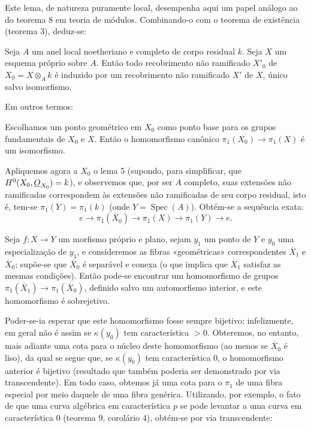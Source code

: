 Este lema, de natureza puramente local, desempenha aqui um papel análogo ao do
teorema 8 em teoria de módulos. Combinando-o com o teorema de existência
(teorema 3), deduz-se:

 Seja $A$ um anel local noetheriano e completo de corpo
residual $k$. Seja $X$ um esquema próprio sobre $A$. Então todo recobrimento
não ramificado $X'_0$ de $X_0=X\otimes_A k$ é induzido por um recobrimento não
ramificado $X'$ de $X$, único salvo isomorfismo.

Em outros termos:

 Escolhamos um ponto geométrico em $X_0$ como ponto base para
os grupos fundamentais de $X_0$ e $X$. Então o homomorfismo canônico
$\pi_1(X_0)\longrightarrow\pi_1(X)$ é um isomorfismo.

Apliquemos agora a $X_0$ o lema 5 (supondo, para simplificar, que
$H^0(X_0,\underline{O}_{X_0})=k$), e observemos que, por ser $A$ completo, suas
extensões não ramificadas correspondem às extensões não ramificadas de seu
corpo residual, isto é, tem-se $\pi_1(Y)=\pi_1(k)$ (onde
$Y=\operatorname{Spec}(A)$). Obtém-se a sequência exata:
\[
  e\longrightarrow\pi_1(\overline X_0)
  \longrightarrow\pi_1(X)\longrightarrow\pi_1(Y)\longrightarrow e.
\]

 Seja $f:X\longrightarrow Y$ um morfismo próprio e plano,
sejam $y_1$ um ponto de $Y$ e $y_0$ uma especialização de $y_1$, e consideremos
as fibras «geométricas» correspondentes $\overline X_1$ e $\overline X_0$;
supõe-se que $\overline X_0$ é separável e conexa (o que implica que
$\overline X_1$ satisfaz as mesmas condições). Então pode-se encontrar um
homomorfismo de grupos
$\pi_1(\overline X_1)\longrightarrow\pi_1(\overline X_0)$, definido salvo um
automorfismo interior, e este homomorfismo é sobrejetivo.

Poder-se-ia esperar que este homomorfismo fosse sempre bijetivo; infelizmente,
em geral não é assim se $\kappa(y_0)$ tem característica $>0$. Obteremos,
no entanto, mais adiante uma cota para o núcleo deste homomorfismo (ao menos se
$\overline X_0$ é liso), da qual se segue que, se $\kappa(y_0)$ tem
característica $0$, o homomorfismo anterior é bijetivo (resultado que também
poderia ser demonstrado por via transcendente). Em todo caso, obtemos já uma cota
para o $\pi_1$ de uma fibra especial por meio daquele de uma fibra genérica.
Utilizando, por exemplo, o fato de que uma curva algébrica em característica
$p$ se pode levantar a uma curva em característica $0$ (teorema 9, corolário
4), obtém-se por via transcendente:

